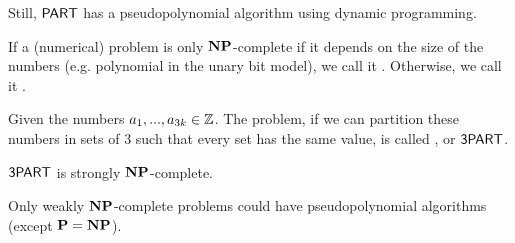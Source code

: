 \begin{remark}
    Still, $\mathsf{PART}$ has a pseudopolynomial algorithm using dynamic programming.
\end{remark}
\begin{definition}
    If a (numerical) problem is only $\mathbf{NP}$-complete if it depends on the size
    of the numbers (e.g. polynomial in the unary bit model), we call it .
    Otherwise, we call it .
\end{definition}
\begin{definition}
    Given the numbers $a_1,...,a_{3k} \in \mathbb{Z}$. The problem, if we can partition these numbers
    in sets of 3 such that every set has the same value, is called , or $\mathsf{3PART}$.
\end{definition}
\begin{theorem}
    $\mathsf{3PART}$ is strongly $\mathbf{NP}$-complete.
\end{theorem}
\begin{remark}
    Only weakly $\mathbf{NP}$-complete problems could have pseudopolynomial algorithms (except $\mathbf{P} = \mathbf{NP}$).
\end{remark}